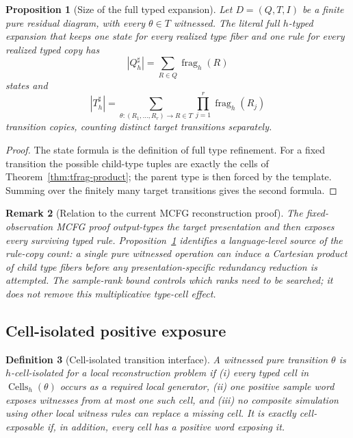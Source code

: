 \documentclass[11pt]{article}
\newtheorem{definition}{Definition}[section]
\newtheorem{proposition}[definition]{Proposition}
\newtheorem{remark}[definition]{Remark}
\newcommand{\frag}{\operatorname{frag}}
\newcommand{\Cells}{\operatorname{Cells}}
\begin{document}
\begin{proposition}[Size of the full typed expansion]
\label{prop:typed-expansion-size}
Let $D=(Q,T,I)$ be a finite pure residual diagram, with every
$\theta\in T$ witnessed.  The literal full $h$-typed expansion that keeps one
state for every realized type fiber and one rule for every realized typed copy
has
\[
  |Q_h^\sharp|=\sum_{R\in Q}\frag_h(R)
\]
states and
\[
  \boxed{
  |T_h^\sharp|
  =\sum_{\theta:(R_1,\ldots,R_r)\to R\in T}
      \prod_{j=1}^r\frag_h(R_j)
  }
\]
transition copies, counting distinct target transitions separately.
\end{proposition}

\begin{proof}
The state formula is the definition of full type refinement.  For a fixed
transition the possible child-type tuples are exactly the cells of
Theorem~\ref{thm:tfrag-product}; the parent type is then forced by the template.
Summing over the finitely many target transitions gives the second formula.
\end{proof}

\begin{remark}[Relation to the current MCFG reconstruction proof]
The fixed-observation MCFG proof output-types the target presentation
and then exposes every surviving typed rule.  Proposition~\ref{prop:typed-expansion-size}
identifies a language-level source of the rule-copy count: a single pure
witnessed operation can induce a Cartesian product of child type fibers before
any presentation-specific redundancy reduction is attempted.  The sample-rank
bound controls which ranks need to be searched; it does not remove this
multiplicative type-cell effect.
\end{remark}

\subsection{Cell-isolated positive exposure}

\begin{definition}[Cell-isolated transition interface]
A witnessed pure transition $\theta$ is \emph{$h$-cell-isolated} for a local
reconstruction problem if (i) every typed cell in $\Cells_h(\theta)$ occurs as
a required local generator, (ii) one positive sample word exposes witnesses
from at most one such cell, and (iii) no composite simulation using other local
witness rules can replace a missing cell.  It is \emph{exactly cell-exposable}
if, in addition, every cell has a positive word exposing it.
\end{definition}
\end{document}

